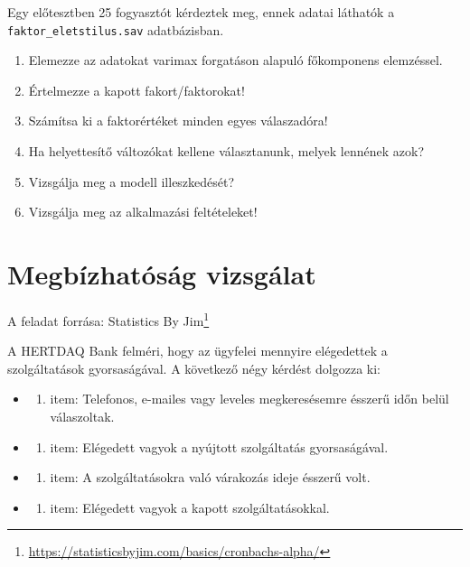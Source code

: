 \documentclass[
  letterpaper,
]{krantz}
\providecommand{\tightlist}{%
  \setlength{\itemsep}{0pt}\setlength{\parskip}{0pt}}\usepackage{longtable,booktabs,array}
\renewcommand{\href}[2]{#2\footnote{\url{#1}}}
\begin{document}
Egy előtesztben 25 fogyasztót kérdeztek meg, ennek adatai láthatók a
\texttt{faktor\_eletstilus.sav} adatbázisban.

\begin{enumerate}
\def\labelenumi{\arabic{enumi}.}
\tightlist
\item
  Elemezze az adatokat varimax forgatáson alapuló főkomponens
  elemzéssel.
\item
  Értelmezze a kapott fakort/faktorokat!
\item
  Számítsa ki a faktorértéket minden egyes válaszadóra!
\item
  Ha helyettesítő változókat kellene választanunk, melyek lennének azok?
\item
  Vizsgálja meg a modell illeszkedését?
\item
  Vizsgálja meg az alkalmazási feltételeket!
\end{enumerate}

\hypertarget{megbuxedzhatuxf3suxe1g-vizsguxe1lat}{%
\chapter{Megbízhatóság
vizsgálat}\label{megbuxedzhatuxf3suxe1g-vizsguxe1lat}}

A feladat forrása:
\href{https://statisticsbyjim.com/basics/cronbachs-alpha/}{Statistics By
Jim}

A HERTDAQ Bank felméri, hogy az ügyfelei mennyire elégedettek a
szolgáltatások gyorsaságával. A következő négy kérdést dolgozza ki:

\begin{itemize}
\item
  \begin{enumerate}
  \def\labelenumi{\arabic{enumi}.}
  \tightlist
  \item
    item: Telefonos, e-mailes vagy leveles megkeresésemre ésszerű időn
    belül válaszoltak.
  \end{enumerate}
\item
  \begin{enumerate}
  \def\labelenumi{\arabic{enumi}.}
  \setcounter{enumi}{1}
  \tightlist
  \item
    item: Elégedett vagyok a nyújtott szolgáltatás gyorsaságával.
  \end{enumerate}
\item
  \begin{enumerate}
  \def\labelenumi{\arabic{enumi}.}
  \setcounter{enumi}{2}
  \tightlist
  \item
    item: A szolgáltatásokra való várakozás ideje ésszerű volt.
  \end{enumerate}
\item
  \begin{enumerate}
  \def\labelenumi{\arabic{enumi}.}
  \setcounter{enumi}{3}
  \tightlist
  \item
    item: Elégedett vagyok a kapott szolgáltatásokkal.
  \end{enumerate}
\end{itemize}
\end{document}
